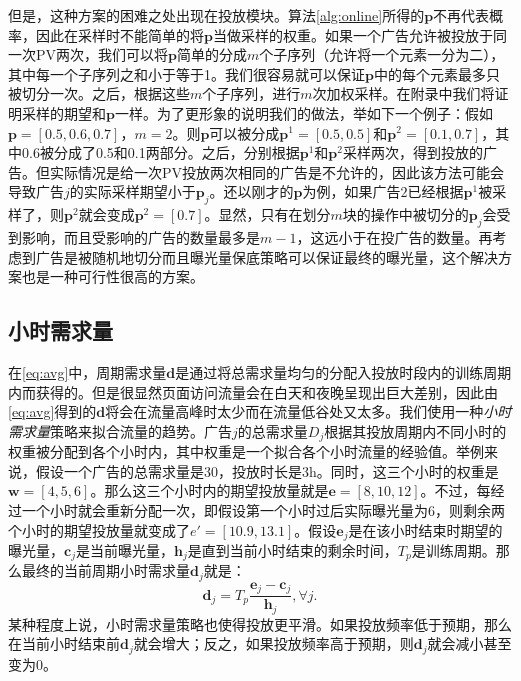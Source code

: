 \begin{enumerate}[1)]
	但是，这种方案的困难之处出现在投放模块。算法\ref{alg:online}所得的$\bm{p}$不再代表概率，因此在采样时不能简单的将$\bm{p}$当做采样的权重。如果一个广告允许被投放于同一次PV两次，我们可以将$\bm{p}$简单的分成$m$个子序列（允许将一个元素一分为二），其中每一个子序列之和小于等于1。我们很容易就可以保证$\bm{p}$中的每个元素最多只被切分一次。之后，根据这些$m$个子序列，进行$m$次加权采样。在附录中我们将证明采样的期望和$\bm{p}$一样。为了更形象的说明我们的做法，举如下一个例子：假如$\bm{p} = [0.5, 0.6, 0.7]$，$m=2$。则$\bm{p}$可以被分成$\bm{p}^1 = [0.5, 0.5]$和$\bm{p}^2 = [0.1, 0.7]$，其中0.6被分成了0.5和0.1两部分。之后，分别根据$\bm{p}^1$和$\bm{p}^2$采样两次，得到投放的广告。但实际情况是给一次PV投放两次相同的广告是不允许的，因此该方法可能会导致广告$j$的实际采样期望小于$\bm{p}_j$。还以刚才的$\bm{p}$为例，如果广告$2$已经根据$\bm{p}^1$被采样了，则$\bm{p}^2$就会变成$\bm{p}^2 = [0.7]$。显然，只有在划分$m$块的操作中被切分的$\bm{p}_j$会受到影响，而且受影响的广告的数量最多是$m-1$，这远小于在投广告的数量。再考虑到广告是被随机地切分而且曝光量保底策略可以保证最终的曝光量，这个解决方案也是一种可行性很高的方案。
	\end{enumerate}

\subsection{小时需求量} \label{subsec:hourly_d}

在\eqref{eq:avg}中，周期需求量$\bm{d}$是通过将总需求量均匀的分配入投放时段内的训练周期内而获得的。但是很显然页面访问流量会在白天和夜晚呈现出巨大差别，因此由\eqref{eq:avg}得到的$\bm{d}$将会在流量高峰时太少而在流量低谷处又太多。我们使用一种\textit{小时需求量}策略来拟合流量的趋势。广告$j$的总需求量$D_j$根据其投放周期内不同小时的权重被分配到各个小时内，其中权重是一个拟合各个小时流量的经验值。举例来说，假设一个广告的总需求量是30，投放时长是3h。同时，这三个小时的权重是$\bm{w} = [4, 5, 6]$。那么这三个小时内的期望投放量就是$\bm{e} = [8, 10, 12]$。不过，每经过一个小时就会重新分配一次，即假设第一个小时过后实际曝光量为6，则剩余两个小时的期望投放量就变成了$e'=[10.9, 13.1]$。假设$\bm{e}_j$是在该小时结束时期望的曝光量，$\bm{c}_j$是当前曝光量，$\bm{h}_j$是直到当前小时结束的剩余时间，$T_p$是训练周期。那么最终的当前周期小时需求量$\bm{d}_j$就是：
\begin{equation}
\bm{d}_j = T_{p}\frac{\bm{e}_j - \bm{c}_j}{\bm{h}_j}, \forall j.
\end{equation}
某种程度上说，小时需求量策略也使得投放更平滑。如果投放频率低于预期，那么在当前小时结束前$\bm{d}_j$就会增大；反之，如果投放频率高于预期，则$\bm{d}_j$就会减小甚至变为0。


